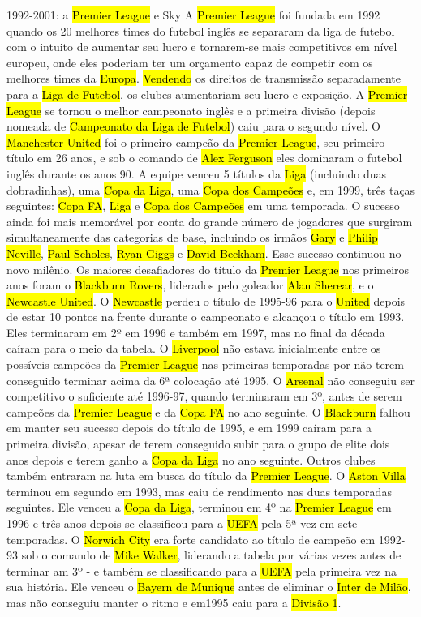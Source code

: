 \documentclass[a4paper,12pt]{article}
\begin{document}
1992-2001: a \hl{Premier League} e Sky
A \hl{Premier League} foi fundada em 1992 quando os 20 melhores times do futebol inglês se separaram da liga de futebol com o intuito de aumentar seu lucro e tornarem-se mais competitivos em nível europeu, onde eles poderiam ter um orçamento capaz de competir com os melhores times da \hl{Europa}. \hl{Vendendo} os direitos de transmissão separadamente para a \hl{Liga de Futebol}, os clubes aumentariam seu lucro e exposição. A \hl{Premier League} se tornou o melhor campeonato inglês e a primeira divisão (depois nomeada de \hl{Campeonato da Liga de Futebol}) caiu para o segundo nível.
O \hl{Manchester United} foi o primeiro campeão da \hl{Premier League}, seu primeiro título em 26 anos, e sob o comando de \hl{Alex Ferguson} eles dominaram o futebol inglês durante os anos 90. A equipe venceu 5 títulos da \hl{Liga} (incluindo duas dobradinhas), uma \hl{Copa da Liga}, uma \hl{Copa dos Campeões} e, em 1999, três taças seguintes: \hl{Copa FA}, \hl{Liga} e \hl{Copa dos Campeões} em uma temporada. O sucesso ainda foi mais memorável por conta do grande número de jogadores que surgiram simultaneamente das categorias de base, incluindo os irmãos \hl{Gary} e \hl{Philip Neville}, \hl{Paul Scholes}, \hl{Ryan Giggs} e \hl{David Beckham}. Esse sucesso continuou no novo milênio.
Os maiores desafiadores do título da \hl{Premier League} nos primeiros anos foram o \hl{Blackburn Rovers}, liderados pelo goleador \hl{Alan Sherear}, e o \hl{Newcastle United}. O \hl{Newcastle} perdeu o título de 1995-96 para o \hl{United} depois de estar 10 pontos na frente durante o campeonato e alcançou o título em 1993. Eles terminaram em 2º em 1996 e também em 1997, mas no final da década caíram para o meio da tabela. O \hl{Liverpool} não estava inicialmente entre os possíveis campeões da \hl{Premier League} nas primeiras temporadas por não terem conseguido terminar acima da 6ª colocação até 1995. O \hl{Arsenal} não conseguiu ser competitivo o suficiente até 1996-97, quando terminaram em 3º, antes de serem campeões da \hl{Premier League} e da \hl{Copa FA} no ano seguinte.
O \hl{Blackburn} falhou em manter seu sucesso depois do título de 1995, e em 1999 caíram para a primeira divisão, apesar de terem conseguido subir para o grupo de elite dois anos depois e terem ganho a \hl{Copa da Liga} no ano seguinte.
Outros clubes também entraram na luta em busca do título da \hl{Premier League}. O \hl{Aston Villa} terminou em segundo em 1993, mas caiu de rendimento nas duas temporadas seguintes. Ele venceu a \hl{Copa da Liga}, terminou em 4º na \hl{Premier League} em 1996 e três anos depois se classificou para a \hl{UEFA} pela 5ª vez em sete temporadas. O \hl{Norwich City} era forte candidato ao título de campeão em 1992-93 sob o comando de \hl{Mike Walker}, liderando a tabela por várias vezes antes de terminar am 3º - e também se classificando para a \hl{UEFA} pela primeira vez na sua história. Ele venceu o \hl{Bayern de Munique} antes de eliminar o \hl{Inter de Milão}, mas não conseguiu manter o ritmo e em1995 caiu para a \hl{Divisão 1}.
\end{document}
